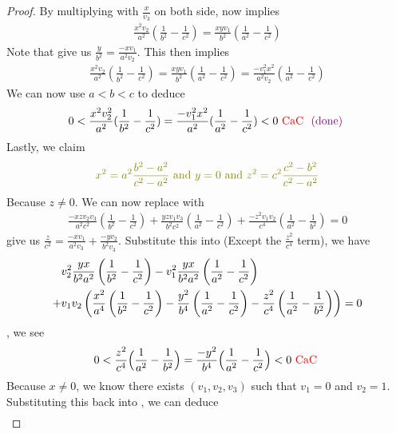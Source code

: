 \documentclass{report}
\begin{document}
\begin{proof}
By multiplying with  $\frac{x}{v_3}$ on both side,  now implies 
\begin{align*}
\frac{x^2 v_2}{a^2}(\frac{1}{b^2}-\frac{1}{c^2})= \frac{xyv_1}{b^2}(\frac{1}{a^2}-\frac{1}{c^2})
\end{align*}
Note that  give us $\frac{y}{b^2}= \frac{-xv_1}{a^2v_2}$. This then implies 
\begin{align*}
\frac{x^2v_2}{a^2}(\frac{1}{b^2}-\frac{1}{c^2})=\frac{xyv_1}{b^2}(\frac{1}{a^2}-\frac{1}{c^2})=\frac{-v_1^2x^2}{a^2v_2}(\frac{1}{a^2}-\frac{1}{c^2})
\end{align*}
We can now use $a<b<c$ to deduce 
\begin{align*}
0<\frac{x^2v_2^2}{a^2}(\frac{1}{b^2}-\frac{1}{c^2})= \frac{-v_1^2x^2}{a^2}(\frac{1}{a^2}-\frac{1}{c^2})<0 \text{ \textcolor{red}{CaC} } \textcolor{violet}{\text{ (done) }}
\end{align*}
Lastly, we claim 
\begin{align*}
  \olive{x^2= a^2 \frac{b^2-a^2}{c^2-a^2}\text{ and }y=0\text{ and }z^2= c^2 \frac{c^2-b^2}{c^2-a^2}}
\end{align*}
Because $z\neq 0$. We can now replace  with 
\begin{align}
\label{eq7}
\frac{-xzv_2v_3}{a^2c^2}(\frac{1}{b^2}-\frac{1}{c^2})+ \frac{yzv_1v_3}{b^2c^2}(\frac{1}{a^2}-\frac{1}{c^2})+ \frac{-z^2 v_1v_2}{c^4}(\frac{1}{a^2}-\frac{1}{b^2})=0
\end{align}
 give us $\frac{z}{c^2}= \frac{-xv_1}{a^2v_3}+ \frac{-yv_2}{b^2v_3}$. Substitute this into  (Except the $\frac{z^2}{c^4}$ term), we have 
\begin{align}
&v_2^2\frac{yx}{b^2a^2}\left(\frac{1}{b^2}-\frac{1}{c^2}\right)-v_1^2\frac{yx}{b^2a^2}\left(\frac{1}{a^2}-\frac{1}{c^2}\right)\notag\\
  +&v_1v_2\left(\frac{x^2}{a^4}\left(\frac{1}{b^2}-\frac{1}{c^2}\right)-\frac{y^2}{b^4}\left(\frac{1}{a^2}-\frac{1}{c^2}\right)-\frac{z^2}{c^4}\left(\frac{1}{a^2}-\frac{1}{b^2}\right)\right) =0\label{eq8}
\end{align}
, we see 
\begin{align*}
0<\frac{z^2}{c^4}\Big(\frac{1}{a^2}-\frac{1}{b^2} \Big)= \frac{-y^2}{b^4}\Big(\frac{1}{a^2}-\frac{1}{c^2} \Big)<0 \text{ \textcolor{red}{CaC} }
\end{align*}
Because $x\neq 0$, we know there exists $(v_1,v_2,v_3)$ such that $v_1=0$ and  $v_2=1$. Substituting this back into , we can deduce 
\begin{align*}

\end{align*}
\end{proof}
\end{document}
